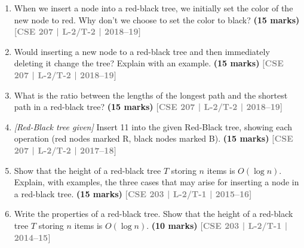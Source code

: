 \documentclass[12pt,a3paper]{article}
\newcommand{\yr}[1]{\hfill\textcolor{gray}{\small\textbf{[#1]}}}
\newcommand{\mk}[1]{\textcolor{orange!70!black}{\small\textbf{(#1 marks)}}}
\begin{document}
\begin{enumerate}
\begin{center}
\end{center}
\mk{15} \yr{CSE 207 | L-2/T-2 | 2019--20}

\item When we insert a node into a red-black tree, we initially set the color of the new node to red. Why don't we choose to set the color to black?
\mk{15} \yr{CSE 207 | L-2/T-2 | 2018--19}

\item Would inserting a new node to a red-black tree and then immediately deleting it change the tree? Explain with an example.
\mk{15} \yr{CSE 207 | L-2/T-2 | 2018--19}

\item What is the ratio between the lengths of the longest path and the shortest path in a red-black tree?
\mk{15} \yr{CSE 207 | L-2/T-2 | 2018--19}

\item \textit{[Red-Black tree given]} Insert 11 into the given Red-Black tree, showing each operation (red nodes marked R, black nodes marked B). \mk{15}
\yr{CSE 207 | L-2/T-2 | 2017--18}

\begin{center}
\end{center}


\item Show that the height of a red-black tree $T$ storing $n$ items is $O(\log n)$. Explain, with examples, the three cases that may arise for inserting a node in a red-black tree. \mk{15}
\yr{CSE 203 | L-2/T-1 | 2015--16}


\item Write the properties of a red-black tree. Show that the height of a red-black tree $T$ storing $n$ items is $O(\log n)$. \mk{10}
\yr{CSE 203 | L-2/T-1 | 2014--15}


\end{enumerate}
\end{document}

